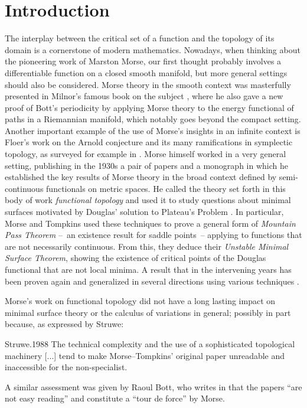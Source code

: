 
\section{Introduction}

The interplay between the critical set of a function and the topology of its domain is a cornerstone of modern mathematics.
Nowadays, when thinking about the pioneering work of Marston Morse, our first thought probably involves a differentiable function on a closed smooth manifold, but more general settings should also be considered.
Morse theory in the smooth context was masterfully presented in Milnor's famous book on the subject \cite{Milnor.1963}, where he also gave a new proof of Bott's periodicity by applying Morse theory to the energy functional of paths in a Riemannian manifold, which notably goes beyond the compact setting.
Another important example of the use of Morse's insights in an infinite context is Floer's work on the Arnold conjecture and its many ramifications in symplectic topology, as surveyed for example in \cite{Salamon.1999}.
Morse himself worked in a very general setting, publishing in the 1930s a pair of papers \cite{Morse.1937, Morse.1940} and a monograph \cite{Morse.1938} in which he established the key results of Morse theory in the broad context defined by semi-continuous functionals on metric spaces.
He called the theory set forth in this body of work \emph{functional topology} and used it to study questions about minimal surfaces motivated by Douglas' solution to Plateau’s Problem \cite{Douglas.1931}.
In particular, Morse and Tompkins \cite{Morse.1939, Morse.1941} used these techniques to prove a general form of \emph{Mountain Pass Theorem} --~an existence result for saddle points~-- applying to functions that are not necessarily continuous.
From this, they deduce their \emph{Unstable Minimal Surface Theorem}, showing the existence of critical points of the Douglas functional that are not local minima.
A result that in the intervening years has been proven again and generalized in several directions using various techniques \cite{1,2,3,4}.

Morse's work on functional topology did not have a long lasting impact on minimal surface theory or the calculus of variations in general; possibly in part because, as expressed by Struwe:
\begin{displaycquote}[p.~82]{Struwe.1988}
	The technical complexity and the use of a sophisticated topological machinery [...] tend to make Morse--Tompkins' original paper unreadable and inaccessible for the non-specialist.
\end{displaycquote}
A similar assessment was given by Raoul Bott, who writes in \cite[p.~934]{Bott.1980} that the papers \cite{Morse.1937, Morse.1940} ``are not easy reading'' and constitute a ``tour de force'' by Morse.

